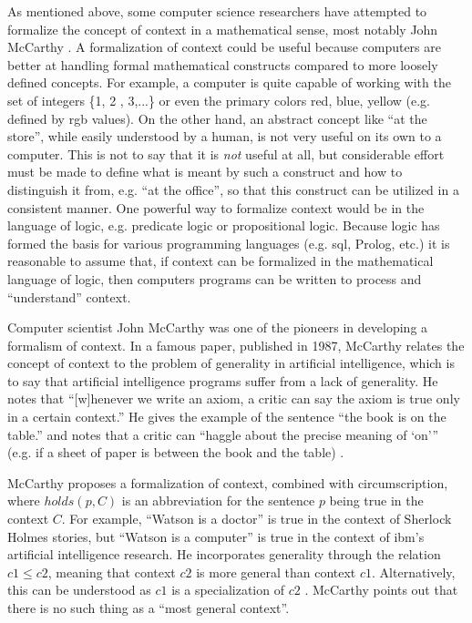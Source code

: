 As mentioned above, some computer science researchers have attempted to formalize the concept of context in a mathematical sense, most notably John McCarthy \cite{McCarthy1993} \cite{mccarthy1997formalizing} . A formalization of context could be useful because computers are better at handling formal mathematical constructs compared to more loosely defined concepts. For example, a computer is quite capable of working with the set of integers \{1, 2 , 3,...\} or even the primary colors {red, blue, yellow} (e.g. defined by \acrshort{rgb} values). On the other hand, an abstract concept like ``at the store'', while easily understood by a human, is not very useful on its own to a computer. This is not to say that it is \emph{not} useful at all, but considerable effort must be made to define what is meant by such a construct and how to distinguish it from, e.g. ``at the office'', so that this construct can be utilized in a consistent manner. One powerful way to formalize context would be in the language of logic, e.g. predicate logic or propositional logic. Because logic has formed the basis for various programming languages (e.g. \acrshort{sql}, Prolog, etc.) it is reasonable to assume that, if context can be formalized in the mathematical language of logic, then computers programs can be written to process and ``understand'' context.

Computer scientist John McCarthy was one of the pioneers in developing a formalism of context. In a famous paper, published in 1987, McCarthy relates the concept of context to the problem of generality in artificial intelligence, which is to say that artificial intelligence programs suffer from a lack of generality. He notes that ``[w]henever we write an axiom, a critic can say the axiom is true only in a certain context.'' He gives the example of the sentence ``the book is on the table.'' and notes that a critic can ``haggle about the precise meaning of `on'\thinspace'' (e.g. if a sheet of paper is between the book and the table) \cite{mccarthy1987generality}. 

McCarthy proposes a formalization of context, combined with circumscription, where $holds(p, C)$ is an abbreviation for the sentence $p$ being true in the context $C$. For example, ``Watson is a doctor'' is true in the context of Sherlock Holmes stories, but ``Watson is a computer'' is true in the context of \acrshort{ibm}'s artificial intelligence research. He incorporates generality through the relation $c1 \le c2$, meaning that context $c2$ is more general than context $c1$. Alternatively, this can be understood as $c1$ is a specialization of $c2$ \cite{akman1996steps}. McCarthy points out that there is no such thing as a ``most general context''.

